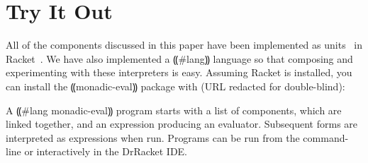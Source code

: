 \section{Try It Out}\label{s:try-it}

All of the components discussed in this paper have been implemented as
units~\cite{local:flatt-pldi98} in Racket~\cite{dvanhorn:plt-tr1}.  We have
also implemented a ⸨#lang⸩ language so that composing and experimenting with
these interpreters is easy.  Assuming Racket is installed, you can install the
⸨monadic-eval⸩ package with (URL redacted for double-blind):

A ⸨#lang monadic-eval⸩ program starts with a list of
components, which are linked together, and an expression producing an
evaluator.  Subsequent forms are interpreted as expressions when run.
Programs can be run from the command-line or interactively in the
DrRacket IDE.
